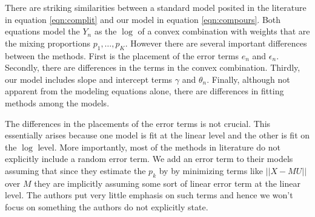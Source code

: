 \documentclass[reqno,12pt,oneside]{report}\usepackage[]{graphicx}\usepackage[]{color}
\theoremstyle{plain}
\theoremstyle{definition}
\theoremstyle{remark}
\numberwithin{theorem}{chapter}     %
\begin{document}
There are striking similarities between a standard model posited in the literature in equation \ref{eqn:complit} and our model in equation \ref{eqn:compours}. Both equations model the $Y_n$ as the $\log$ of a convex combination with weights that are the mixing proportions $p_1,\ldots,p_K$. However there are several important differences between the methods. First is the placement of the error terms $e_n$ and $\epsilon_n$. Secondly, there are differences in the terms in the convex combination. Thirdly, our model includes slope and intercept terms $\gamma$ and $\theta_n$. Finally, although not apparent from the modeling equations alone, there are differences in fitting methods among the models. 

The differences in the placements of the error terms is not crucial. This essentially arises because one model is fit at the linear level and the other is fit on the $\log$ level. More importantly, most of the methods in literature do not explicitly include a random error term. We add an error term to their models assuming that since they estimate the $p_k$ by by minimizing terms like $||X-MU||$ over $M$ they are implicitly assuming some sort of linear error term at the linear level. The authors put very little emphasis on such terms and hence we won't focus on something the authors do not explicitly state.
\end{document}
